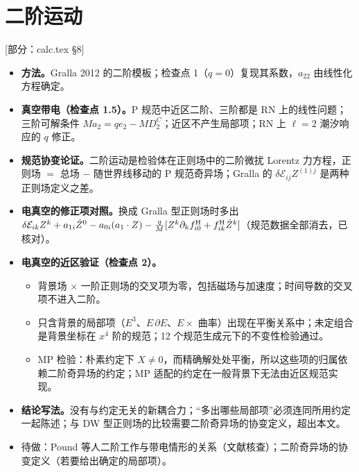\documentclass[11pt,a4paper]{ctexart}
\newcommand{\status}[1]{\hfill{\small\color{blue!50!black}[#1]}}
\begin{document}
\section{二阶运动}\label{sec:o-second}
\status{部分：calc.tex \S8}
\begin{itemize}[nosep]
\item \textbf{方法。}Gralla 2012 的二阶模板；检查点 1（$q=0$）复现其系数，$a_{22}$ 由线性化方程确定。
\item \textbf{真空带电（检查点 1.5）。}P 规范中近区二阶、三阶都是 RN 上的线性问题；三阶可解条件 $Ma_2=qe_2-MD^C_2$；近区不产生局部项；RN 上 $\ell=2$ 潮汐响应的 $q$ 修正。
\item \textbf{规范协变论证。}二阶运动是检验体在正则场中的二阶微扰 Lorentz 力方程，正则场 $=$ 总场 $-$ 随世界线移动的 P 规范奇异场；Gralla 的 $\delta\mathcal E_{ij}Z^{(1)j}$ 是两种正则场定义之差。
\item \textbf{电真空的修正项对照。}换成 Gralla 型正则场时多出 $\delta\mathcal E_{ik}Z^k+a_{1i}\dot Z^0-a_{0i}(a_1\cdot Z)-\tfrac qM[Z^k\partial_kf^{\rm H}_{i0}+f^{\rm H}_{ik}\dot Z^k]$（规范数据全部消去，已核对）。
\item \textbf{电真空的近区验证（检查点 2）。}
  \begin{itemize}[nosep]
  \item 背景场 $\times$ 一阶正则场的交叉项为零，包括磁场与加速度；时间导数的交叉项不进入二阶。
  \item 只含背景的局部项（$E^3$、$E\,\partial E$、$E\times$ 曲率）出现在平衡关系中；未定组合是背景坐标在 $x^4$ 阶的规范；12 个规范生成元下的不变性检验通过。
  \item MP 检验：朴素约定下 $X\neq0$，而精确解处处平衡，所以这些项的归属依赖二阶奇异场的约定；MP 适配的约定在一般背景下无法由近区规范实现。
  \end{itemize}
\item \textbf{结论写法。}没有与约定无关的新耦合力；“多出哪些局部项”必须连同所用约定一起陈述；与 DW 型正则场的比较需要二阶奇异场的协变定义，超出本文。
\item 待做：Pound 等人二阶工作与带电情形的关系（文献核查）；二阶奇异场的协变定义（若要给出确定的局部项）。
\end{itemize}

\end{document}
